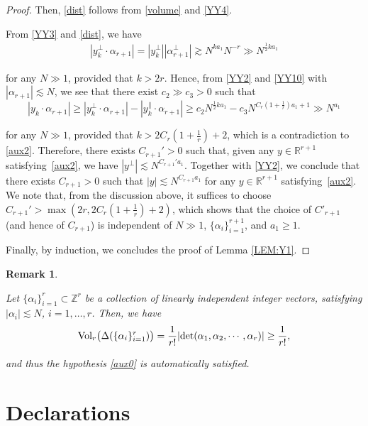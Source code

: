 \documentclass[%
11pt,  reqno]{amsart}
\newtheorem{remark}[theorem]{Remark}
\newcommand{\1}{\hspace{0.2mm}\text{I}\hspace{0.2mm}}
\newcommand{\noi}{\noindent}
\newcommand{\Z}{\mathbb{Z}}
\newcommand{\R}{\mathbb{R}}
\newcommand{\al}{\alpha}
\newcommand{\Dl}{\Delta}
\newcommand{\les}{\lesssim}
\newcommand{\ges}{\gtrsim}
\numberwithin{equation}{section}
\numberwithin{theorem}{section}
\begin{document}
\begin{proof}
\noi
Then, \eqref{dist} follows from \eqref{volume}
and \eqref{YY4}.


From \eqref{YY3} and \eqref{dist}, we have 
\begin{align}
|y_k^\perp \cdot \al_{r+1}| = |y_k^\perp| |\al^\perp_{r+1}| 
 \ges N^{k  a_1} N^{-r} \gg N^{\frac 12 k a_1}
\label{YY10}
\end{align}


\noi
for any $N \gg1$, provided that $k > 2r$.
Hence, 
from \eqref{YY2} and  \eqref{YY10} with $|\al_{r+1}| \les N$, 
we see that there exist $c_2 \gg c_3 > 0$ such that 
\[
|y_k \cdot \al_{r+1}| \ge |y_k^\perp \cdot \al_{r+1}| - |y_k^\parallel \cdot \al_{r+1}| 
\ge c_2 N^{\frac 12 k a_1} - c_3 N^{C_r (1+ \frac 1r) a_1 + 1}
\gg N^{a_1} 
\]

\noi
for any $N \gg 1$, provided that 
$k > 2  C_r (1+ \frac 1r) +2$, 
which is a contradiction to \eqref{aux2}.
Therefore, 
there exists  $C_{r+1}' > 0$ such that, 
given any $y \in \R^{r+1}$
satisfying~\eqref{aux2}, 
we have 
 $|y^\perp| \les N^{C_{r+1}' a_1}$.
 Together with \eqref{YY2}, we conclude that  
there exists $C_{r+1} > 0$ such that 
 $|y|\les N^{C_{r+1}a_1}$ for 
 any $y \in \R^{r+1}$
satisfying~\eqref{aux2}.
We note that, from the discussion above, 
it suffices to choose $C_{r+1}' > \max(2r, 
2C_r (1+ \frac 1r) +2)$, 
which shows that the choice of $C'_{r+1}$ (and hence of $C_{r+1}$)
is independent of $N \gg1$, 
$\{\al_i \}_{i=1}^{r+1}$,  and $a_1\ge 1$.

Finally, by induction, we 
 concludes the proof of Lemma \ref{LEM:Y1}.
\end{proof}


\begin{remark}\label{REM:Y2}\rm

Let  $\{\al_i \}_{i=1}^r \subset \Z^r$ be a collection of linearly independent  {\it integer} vectors,
 satisfying 
$ |\al_i| \les  N$, $i = 1, \dots, r$.
Then, 
we have 
\begin{align*}
\textup{Vol}_{r}
\big(\Dl(\{\al_i\}_{i = 1}^{r})\big) 
= \frac1{r!} |{\rm det} (\al_1,\al_2,\cdots, \al_{r})|\ge \frac1{r!}, 
\end{align*}

\noi
and thus the hypothesis \eqref{aux0} is automatically satisfied.

\end{remark}





\section{Declarations}
\end{document}
